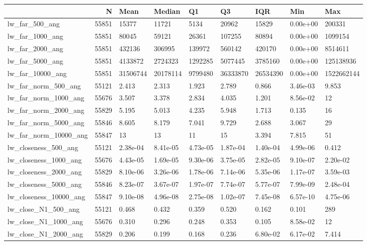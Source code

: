 \begin{tabular}{lrlllllll}
\toprule
 & N & Mean & Median & Q1 & Q3 & IQR & Min & Max \\
\midrule
lw\_far\_500\_ang & 55851 & 15377 & 11721 & 5134 & 20962 & 15829 & 0.00e+00 & 200331 \\
lw\_far\_1000\_ang & 55851 & 80045 & 59121 & 26361 & 107255 & 80894 & 0.00e+00 & 1099154 \\
lw\_far\_2000\_ang & 55851 & 432136 & 306995 & 139972 & 560142 & 420170 & 0.00e+00 & 8514611 \\
lw\_far\_5000\_ang & 55851 & 4133872 & 2724323 & 1292285 & 5077445 & 3785160 & 0.00e+00 & 125138936 \\
lw\_far\_10000\_ang & 55851 & 31506744 & 20178114 & 9799480 & 36333870 & 26534390 & 0.00e+00 & 1522662144 \\
lw\_far\_norm\_500\_ang & 55121 & 2.413 & 2.313 & 1.923 & 2.789 & 0.866 & 3.46e-03 & 9.853 \\
lw\_far\_norm\_1000\_ang & 55676 & 3.507 & 3.378 & 2.834 & 4.035 & 1.201 & 8.56e-02 & 12 \\
lw\_far\_norm\_2000\_ang & 55829 & 5.195 & 5.013 & 4.235 & 5.948 & 1.713 & 0.135 & 16 \\
lw\_far\_norm\_5000\_ang & 55846 & 8.605 & 8.179 & 7.041 & 9.729 & 2.688 & 3.067 & 29 \\
lw\_far\_norm\_10000\_ang & 55847 & 13 & 13 & 11 & 15 & 3.394 & 7.815 & 51 \\
lw\_closeness\_500\_ang & 55121 & 2.38e-04 & 8.41e-05 & 4.73e-05 & 1.87e-04 & 1.40e-04 & 4.99e-06 & 0.412 \\
lw\_closeness\_1000\_ang & 55676 & 4.43e-05 & 1.69e-05 & 9.30e-06 & 3.75e-05 & 2.82e-05 & 9.10e-07 & 2.20e-02 \\
lw\_closeness\_2000\_ang & 55829 & 8.10e-06 & 3.26e-06 & 1.78e-06 & 7.14e-06 & 5.35e-06 & 1.17e-07 & 3.59e-03 \\
lw\_closeness\_5000\_ang & 55846 & 8.23e-07 & 3.67e-07 & 1.97e-07 & 7.74e-07 & 5.77e-07 & 7.99e-09 & 2.48e-04 \\
lw\_closeness\_10000\_ang & 55847 & 9.10e-08 & 4.96e-08 & 2.75e-08 & 1.02e-07 & 7.45e-08 & 6.57e-10 & 4.75e-06 \\
lw\_close\_N1\_500\_ang & 55121 & 0.468 & 0.432 & 0.359 & 0.520 & 0.162 & 0.101 & 289 \\
lw\_close\_N1\_1000\_ang & 55676 & 0.310 & 0.296 & 0.248 & 0.353 & 0.105 & 8.58e-02 & 12 \\
lw\_close\_N1\_2000\_ang & 55829 & 0.206 & 0.199 & 0.168 & 0.236 & 6.80e-02 & 6.17e-02 & 7.414 \\

\end{tabular}
